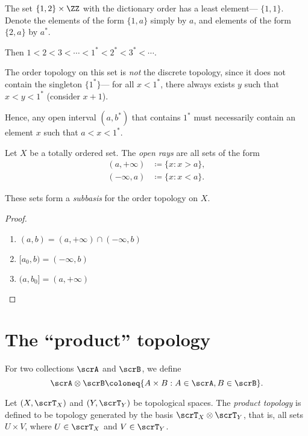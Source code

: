 \documentclass{article}
\begin{document}
\begin{example}
    The set $\{1,2\} \times \ZZ$ with the dictionary order has a least element--- $\{1,1\}$.
    Denote the elements of the form $\{1, a\}$ simply by $a$, and elements of the form $\{2, a\}$ by $a^\ast$.

    Then $1 < 2 < 3 < \cdots < 1^\ast < 2^\ast < 3^\ast < \cdots$.

    The order topology on this set is \textit{not} the discrete topology, since it does not contain the singleton $\{1^\ast\}$--- for all $x < 1^\ast$, there always exists $y$ such that $x < y < 1^\ast$ (consider $x+1$).

    Hence, any open interval $(a, b^\ast)$ that contains $1^\ast$ must necessarily contain an element $x$ such that $a < x < 1^\ast$.
\end{example}

\begin{definition}
    Let $X$ be a totally ordered set.
    The \textit{open rays} are all sets of the form
    \begin{align*}
        (a, +\infty) &\coloneq \{x: x > a\}, \\
        (-\infty, a) &\coloneq \{x: x < a\}.
    \end{align*}

    These sets form a \textit{subbasis} for the order topology on $X$.
\end{definition}

\begin{proof}
    \begin{enumerate}[label=(\arabic*)]
        \item $(a,b) = (a, +\infty) \cap (-\infty, b)$
        \item $[a_0, b) = (-\infty, b)$
        \item $(a, b_0] = (a, +\infty)$
    \end{enumerate}
\end{proof}

\section{The ``product'' topology}

\begin{convention}
    For two collections $\scrA$ and $\scrB$, we define
    \[
        \scrA \otimes \scrB \coloneq \{A \times B: A \in \scrA, B \in \scrB\}.
    \]
\end{convention}

\begin{definition}\label{def:producttopology}
    Let $(X, \scrT_X)$ and $(Y, \scrT_Y)$ be topological spaces.
    The \textit{product topology} is defined to be topology generated by the basis $\scrT_X \otimes \scrT_Y$, that is, all sets $U \times V$, where $U \in \scrT_X$ and $V \in \scrT_Y$.
\end{definition}
\end{document}
